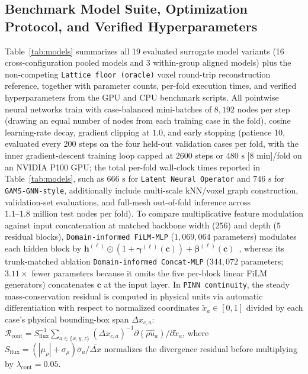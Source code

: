 \documentclass[11pt]{article}
\begin{document}
\subsection{Benchmark Model Suite, Optimization Protocol, and Verified Hyperparameters}
Table~\ref{tab:models} summarizes all 19 evaluated surrogate model variants (16 cross-configuration pooled models and 3 within-group aligned models) plus the non-competing \texttt{Lattice floor (oracle)} voxel round-trip reconstruction reference, together with parameter counts, per-fold execution times, and verified hyperparameters from the GPU and CPU benchmark scripts. All pointwise neural networks train with case-balanced mini-batches of $8,192$ nodes per step (drawing an equal number of nodes from each training case in the fold), cosine learning-rate decay, gradient clipping at $1.0$, and early stopping (patience 10, evaluated every 200 steps on the four held-out validation cases per fold, with the inner gradient-descent training loop capped at 2600 steps or $480\text{ s}$ [$8\text{ min}$]/fold on an NVIDIA P100 GPU; the total per-fold wall-clock times reported in Table~\ref{tab:models}, such as $666\text{ s}$ for \texttt{Latent Neural Operator} and $746\text{ s}$ for \texttt{GAMS-GNN-style}, additionally include multi-scale kNN/voxel graph construction, validation-set evaluations, and full-mesh out-of-fold inference across $1.1\text{--}1.8\text{ million}$ test nodes per fold). To compare multiplicative feature modulation against input concatenation at matched backbone width ($256$) and depth ($5$ residual blocks), \texttt{Domain-informed FiLM-MLP} ($1,069,064$ parameters) modulates each hidden block by $\mathbf{h}^{(\ell)} \odot (1 + \boldsymbol{\gamma}^{(\ell)}(\mathbf{c})) + \boldsymbol{\beta}^{(\ell)}(\mathbf{c})$~\cite{perez2018film}, whereas its trunk-matched ablation \texttt{Domain-informed Concat-MLP} ($344,072$ parameters; $3.11\times$ fewer parameters because it omits the five per-block linear FiLM generators) concatenates $\mathbf{c}$ at the input layer. In \texttt{PINN continuity}, the steady mass-conservation residual is computed in physical units via automatic differentiation with respect to normalized coordinates $\tilde{x}_a \in [0,1]$ divided by each case's physical bounding-box span $\Delta x_{c,a}$: $\mathcal{R}_{\mathrm{cont}} = S_{\mathrm{flux}}^{-1}\sum_{a\in\{x,y,z\}} (\Delta x_{c,a})^{-1}\partial(\hat{\rho}\hat{u}_a)/\partial \tilde{x}_a$, where $S_{\mathrm{flux}} = (|\mu_\rho|+\sigma_\rho)\bar{\sigma}_u / \overline{\Delta x}$ normalizes the divergence residual before multiplying by $\lambda_{\mathrm{cont}} = 0.05$.
\end{document}
